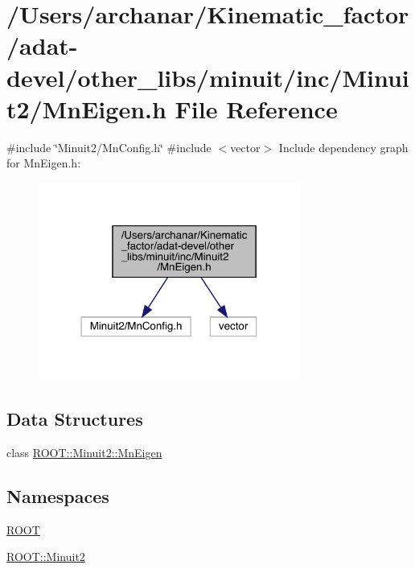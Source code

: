 \hypertarget{adat-devel_2other__libs_2minuit_2inc_2Minuit2_2MnEigen_8h}{}\section{/\+Users/archanar/\+Kinematic\+\_\+factor/adat-\/devel/other\+\_\+libs/minuit/inc/\+Minuit2/\+Mn\+Eigen.h File Reference}
\label{adat-devel_2other__libs_2minuit_2inc_2Minuit2_2MnEigen_8h}
{\ttfamily \#include \char`\"{}Minuit2/\+Mn\+Config.\+h\char`\"{}}\newline
{\ttfamily \#include $<$vector$>$}\newline
Include dependency graph for Mn\+Eigen.\+h\+:
\nopagebreak
\begin{figure}[H]
\begin{center}
\leavevmode
\includegraphics[width=244pt]{dd/d53/adat-devel_2other__libs_2minuit_2inc_2Minuit2_2MnEigen_8h__incl}
\end{center}
\end{figure}
\subsection*{Data Structures}
\begin{DoxyCompactItemize}
\item 
class \mbox{\hyperlink{classROOT_1_1Minuit2_1_1MnEigen}{R\+O\+O\+T\+::\+Minuit2\+::\+Mn\+Eigen}}
\end{DoxyCompactItemize}
\subsection*{Namespaces}
\begin{DoxyCompactItemize}
\item 
 \mbox{\hyperlink{namespaceROOT}{R\+O\+OT}}
\item 
 \mbox{\hyperlink{namespaceROOT_1_1Minuit2}{R\+O\+O\+T\+::\+Minuit2}}
\end{DoxyCompactItemize}
